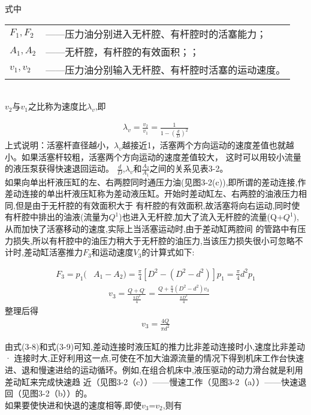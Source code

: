 \noindent 式中 
\begin{tabular}[t]{ll}
 $F_1,F_2$ &——压力油分别进入无杆腔、有杆腔时的活塞能力；\\
 $A_1,A_2$ &——无杆腔，有杆腔的有效面积；；\\
 $v_1,v_2$ &——压力油分别输入无杆腔、有杆腔时活塞的运动速度。\\
\end{tabular}\\

$v_2$与$v_1$之比称为速度比$\lambda _v$,即

\begin{align}
    \lambda _v=\frac{v_2}{v_1}=\frac{1}{1-(\frac{d}{D})^2}
\end{align}
上式说明：活塞杆直径越小，$\lambda _v$越接近1，活塞两个方向运动的速度差值也就越小。如果活塞杆较粗，活塞两个方向运动的速度差值较大，
这时可以用较小流量的液压泵获得快速退回运动。
$\displaystyle\tfrac{d}{D}$,$\lambda_v$和$\tfrac{A_2}{A_1}$之间的关系见表3-2。 \\

如果向单出杆液压缸的左、右两腔同时通压力油(见图3-2(c)),即所谓的差动连接,作差动连接的单出杆液压缸称为差动液压缸。开始时差动缸左、右两腔的油液压力相同,但是由于无杆腔的有效面积大于
有杆腔的有效面积,故活塞将向右运动,同时使有杆腔中排出的油液(流量为$Q^1$)也进入无杆腔,加大了流入无杆腔的流量(Q+$Q^1$),从而加快了活塞移动的速度,实际上当活塞运动时,由于差动缸两腔间
的管路中有压力损失,所以有杆腔中的油压力稍大于无杆腔的油压力,当该压力损失很小可忽略不计时,差动缸活塞推力$F_3$和运动速度$V_3$的计算式如下:
  

\begin{align}
    F_3=p_1(&A_1-A_2)=\frac{\pi}{4}[D^2-(D^2-d^2)]p_1=\frac{\pi}{4}d^2p_1
\end{align}
\begin{align*}
    &v_3=\displaystyle\frac{Q+Q^,}{\displaystyle\frac{\pi D^2}{4}}=\displaystyle\frac{Q+\displaystyle\frac{\pi}{4}(D^2-d^2)v_3}{\displaystyle\frac{\pi D^2}{4}}
\end{align*}
整理后得
\begin{align}
    v_3=\frac{4Q}{\pi d^2}
\end{align}

由式(3-8)和式(3-9)可知,差动连接时液压缸的推力比非差动连接时小,速度比非差动· 连接时大,正好利用这一点,可使在不加大油源流量的情况下得到机床工作台快速进、退和慢速进给的运动循环。例如,在组合机床中,液压驱动的动力滑台就是利用差动缸来完成快速趋
\newpage
\noindent
近（见图3-2（c））——慢速工作（见图3-2（a））——快速退回（见图3-2（b））的。\\
\indent
如果要使快进和快退的速度相等,即使$v_3$=$v_2$,则有

